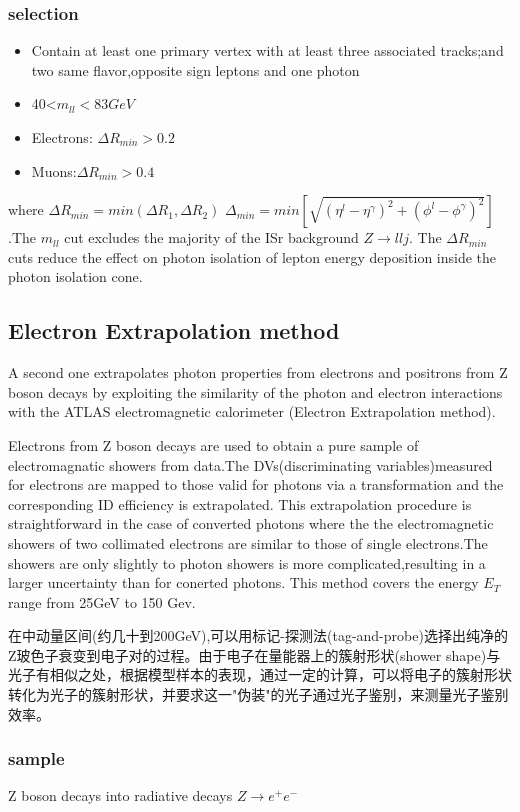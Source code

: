 \documentclass{ctexart}
\begin{document}
\subsubsection{selection}
\begin{itemize}
    \item Contain at least one primary vertex with at least three associated tracks;and two same flavor,opposite sign leptons and one photon
    \item 40<$m_{ll}<83GeV$
    \item Electrons: $\Delta R_{min}>0.2$
    \item Muons:$\Delta R_{min}>0.4$
\end{itemize}
where $\Delta R_{min}=min(\Delta R_1,\Delta R_2)$ $\Delta_{min}=min[\sqrt{(\eta^l-\eta^\gamma)^2+(\phi^l-\phi^\gamma)^2}]$.The $m_{ll} $ cut excludes the majority of the ISr background $Z\rightarrow llj$. The $\Delta R_{min}$ cuts reduce the effect on photon isolation of lepton energy deposition inside the photon isolation cone.
\subsection{Electron Extrapolation method}

A second one extrapolates photon properties from electrons
and positrons from Z boson decays by exploiting
the similarity of the photon and electron interactions with
the ATLAS electromagnetic calorimeter (Electron Extrapolation
method).\par
Electrons from Z boson decays are used to obtain a pure sample of electromagnatic showers from data.The DVs(discriminating variables)measured for electrons are mapped to those valid for photons via  a transformation and the corresponding ID efficiency is extrapolated. This extrapolation procedure is straightforward in the case of converted photons where the the electromagnetic showers of two collimated electrons are similar to those of single electrons.The showers are only slightly to photon showers is more complicated,resulting in a larger uncertainty than for conerted photons. This method covers the energy $E_T$ range from 25GeV to 150 Gev.\par
在中动量区间(约几十到200GeV),可以用标记-探测法(tag-and-probe)选择出纯净的Z玻色子衰变到电子对的过程。由于电子在量能器上的簇射形状(shower shape)与光子有相似之处，根据模型样本的表现，通过一定的计算，可以将电子的簇射形状转化为光子的簇射形状，并要求这一"伪装"的光子通过光子鉴别，来测量光子鉴别效率。
\subsubsection{sample}
Z boson decays into radiative decays $Z\rightarrow e^+e^-$
\end{document}
